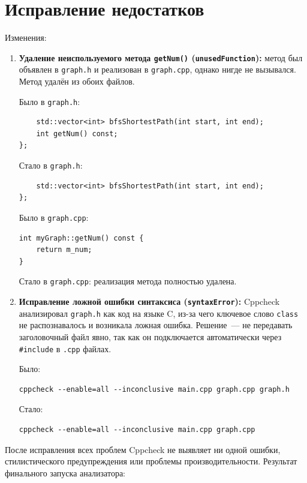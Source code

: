 \documentclass{article}[14pt]
\begin{document}
\section{Исправление недостатков}

Изменения:
 
\begin{enumerate}
 
\item \textbf{Удаление неиспользуемого метода \texttt{getNum()} (\texttt{unusedFunction}):}
метод был объявлен в \texttt{graph.h} и реализован в \texttt{graph.cpp},
однако нигде не вызывался. Метод удалён из обоих файлов.
 
Было в \texttt{graph.h}:
\begin{lstlisting}
    std::vector<int> bfsShortestPath(int start, int end);
    int getNum() const;
};
\end{lstlisting}
 
Стало в \texttt{graph.h}:
\begin{lstlisting}
    std::vector<int> bfsShortestPath(int start, int end);
};
\end{lstlisting}
 
Было в \texttt{graph.cpp}:
\begin{lstlisting}
int myGraph::getNum() const {
    return m_num;
}
\end{lstlisting}
 
Стало в \texttt{graph.cpp}: реализация метода полностью удалена.
 
\item \textbf{Исправление ложной ошибки синтаксиса (\texttt{syntaxError}):}
Cppcheck анализировал \texttt{graph.h} как код на языке C, из-за чего
ключевое слово \texttt{class} не распознавалось и возникала ложная ошибка.
Решение~--- не передавать заголовочный файл явно, так как он подключается
автоматически через \texttt{\#include} в \texttt{.cpp} файлах.
 
Было:
\begin{lstlisting}
cppcheck --enable=all --inconclusive main.cpp graph.cpp graph.h
\end{lstlisting}
 
Стало:
\begin{lstlisting}
cppcheck --enable=all --inconclusive main.cpp graph.cpp
\end{lstlisting}
 
\end{enumerate}
 
После исправления всех проблем Cppcheck не выявляет ни одной ошибки,
стилистического предупреждения или проблемы производительности.
Результат финального запуска анализатора:
 
\end{document}
